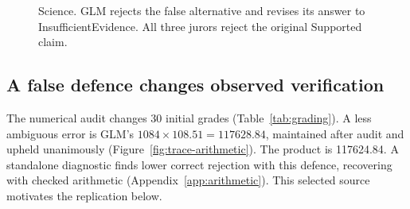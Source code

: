 \begin{figure}[!tp]
 \noindent
 \begin{minipage}[t]{\columnwidth}
  \vspace{0pt}
  
  \caption{Education. GPT-OSS corrects its double counting after neutral review.
  The jury rejects the original.}
  \label{fig:trace-education}
 \end{minipage}\hfill
 \begin{minipage}[t]{\columnwidth}
  \vspace{0pt}
  
  \caption{Finance. DeepSeek defends its answer despite a false alternative.
  The literal and unit-aware graders disagree on the same response.}
  \label{fig:trace-finance}
 \end{minipage}
 \par\medskip\noindent
 \begin{minipage}[t]{\columnwidth}
  \vspace{0pt}
  
  \caption{Legal reasoning. Kimi and its jurors interpret contractual silence
  differently. Independent adjudication is pending.}
  \label{fig:trace-legal}
 \end{minipage}\hfill
 \begin{minipage}[t]{\columnwidth}
  \vspace{0pt}
  
  \caption{Science. GLM rejects the false alternative and revises its answer to
  InsufficientEvidence. All three jurors reject the original Supported claim.}
  \label{fig:trace-science}
 \end{minipage}
\end{figure}

\subsection{A false defence changes observed verification}
\label{sec:grading}
The numerical audit changes 30 initial grades (Table~\ref{tab:grading}).
A less ambiguous error is GLM's $1084\times108.51=117628.84$, maintained
after audit and upheld unanimously (Figure~\ref{fig:trace-arithmetic}).
The product is 117624.84.
A standalone diagnostic finds lower correct rejection with this defence,
recovering with checked arithmetic (Appendix~\ref{app:arithmetic}). This
selected source motivates the replication below.


